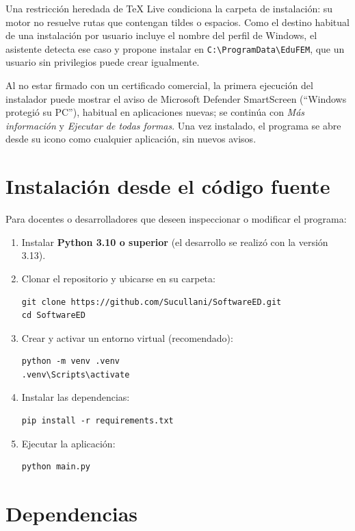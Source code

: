 Una restricción heredada de \TeX{} Live condiciona la carpeta de instalación: su motor no resuelve rutas que contengan tildes o espacios. Como el destino habitual de una instalación por usuario incluye el nombre del perfil de Windows, el asistente detecta ese caso y propone instalar en \texttt{C:\textbackslash ProgramData\textbackslash EduFEM}, que un usuario sin privilegios puede crear igualmente.

Al no estar firmado con un certificado comercial, la primera ejecución del instalador puede mostrar el aviso de Microsoft Defender SmartScreen (\enquote{Windows protegió su PC}), habitual en aplicaciones nuevas; se continúa con \emph{Más información} y \emph{Ejecutar de todas formas}. Una vez instalado, el programa se abre desde su icono como cualquier aplicación, sin nuevos avisos.

\section{Instalación desde el código fuente}

Para docentes o desarrolladores que deseen inspeccionar o modificar el programa:

\begin{enumerate}
    \item Instalar \textbf{Python 3.10 o superior} (el desarrollo se realizó con la versión 3.13).
    \item Clonar el repositorio y ubicarse en su carpeta:
\begin{verbatim}
git clone https://github.com/Sucullani/SoftwareED.git
cd SoftwareED
\end{verbatim}
    \item Crear y activar un entorno virtual (recomendado):
\begin{verbatim}
python -m venv .venv
.venv\Scripts\activate
\end{verbatim}
    \item Instalar las dependencias:
\begin{verbatim}
pip install -r requirements.txt
\end{verbatim}
    \item Ejecutar la aplicación:
\begin{verbatim}
python main.py
\end{verbatim}
\end{enumerate}

\section{Dependencias}

